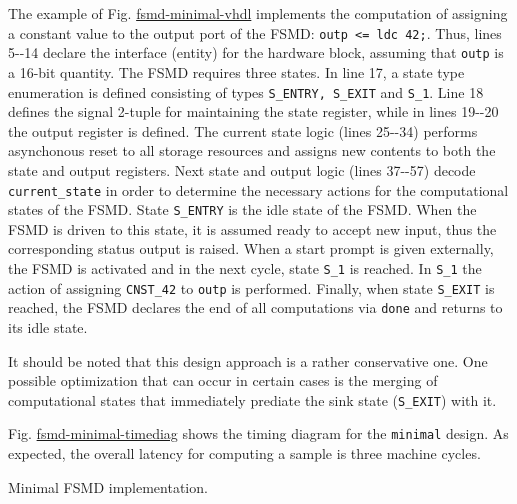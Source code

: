 \documentclass[a4paper]{article}
\begin{document}
The example of Fig. \hyperref[fsmd-minimal-vhdl]{fsmd-minimal-vhdl} implements the computation of assigning
a constant value to the output port of the FSMD: \texttt{outp <= ldc 42;}. Thus,
lines 5-{}-14 declare the interface (entity) for the hardware block, assuming that
\texttt{outp} is a 16-bit quantity. The FSMD requires three states. In line 17, a
state type enumeration is defined consisting of types \texttt{S\_ENTRY, S\_EXIT} and
\texttt{S\_1}. Line 18 defines the signal 2-tuple for maintaining the state register,
while in lines 19-{}-20 the output register is defined. The current state logic
(lines 25-{}-34) performs asynchonous reset to all storage resources and assigns
new contents to both the state and output registers. Next state and output logic
(lines 37-{}-57) decode \texttt{current\_state} in order to determine the necessary
actions for the computational states of the FSMD. State \texttt{S\_ENTRY} is the idle
state of the FSMD. When the FSMD is driven to this state, it is assumed ready to
accept new input, thus the corresponding status output is raised. When a start
prompt is given externally, the FSMD is activated and in the next cycle, state
\texttt{S\_1} is reached. In \texttt{S\_1} the action of assigning \texttt{CNST\_42} to \texttt{outp}
is performed. Finally, when state \texttt{S\_EXIT} is reached, the FSMD declares the
end of all computations via \texttt{done} and returns to its idle state.

It should be noted that this design approach is a rather conservative one. One
possible optimization that can occur in certain cases is the merging of
computational states that immediately prediate the sink state (\texttt{S\_EXIT}) with
it.

Fig. \hyperref[fsmd-minimal-timediag]{fsmd-minimal-timediag} shows the timing diagram for the \texttt{minimal} design.
As expected, the overall latency for computing a sample is three machine cycles.

\label{fsmd-minimal}
Minimal FSMD implementation.
\end{document}
